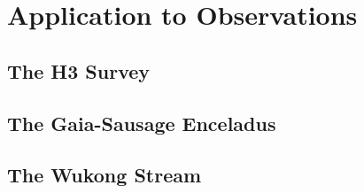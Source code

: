 \documentclass[ms.tex]{subfiles}
\begin{document}
\section{Application to Observations}
\label{sec:h3}

\subsection{The H3 Survey}
\label{sec:h3:survey}

\subsection{The Gaia-Sausage Enceladus}
\label{sec:h3:gse}

\subsection{The Wukong Stream}
\label{sec:h3:wukong}
\end{document}
